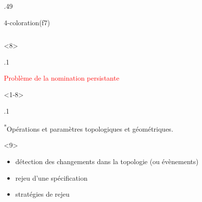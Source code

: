 \begin{frame}[c,fragile]
\begin{columns}
\begin{column}{.49\textwidth}
\begin{minipage}[c][.7\textheight][t]{.7\linewidth}
\begin{myblock}
{					{4-{\color{gray}coloration}({\color{myblueink}f7})}%
					}
				\end{myblock}
			\end{minipage}
		\end{column}
	\end{columns}
	\begin{onlyenv}
		\begin{overlayarea}{\textwidth}{.1\textheight}
			\begin{myblock}{}
				\textcolor{red}{Problème de la nomination persistante}
			\end{myblock}
		\end{overlayarea}
	\end{onlyenv}
	\vfill
	\begin{onlyenv}<1-8>
		\begin{overlayarea}{\textwidth}{.1\textheight}
			\begin{myblock}{}
				{\textsuperscript{*}\color{mydarkgreenink}Opérations} et paramètres {\color{myblueink}topologiques} et {\color{orange}géométriques}.
			\end{myblock}
		\end{overlayarea}
	\end{onlyenv}
	\begin{onlyenv}
		\vspace{-1em}
		\begin{myblock}
			\begin{itemize}
				\item détection des changements dans la topologie (ou évènements)
				\item rejeu d'une spécification
				\item stratégies de rejeu
			\end{itemize}
		\end{myblock}
	\end{onlyenv}
\end{frame}


